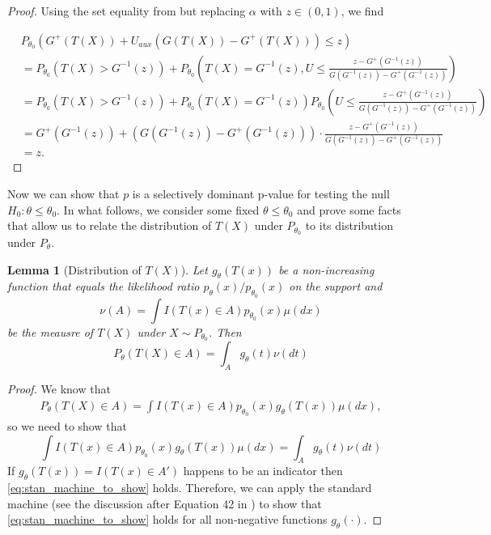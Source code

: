 \documentclass{article}
\newtheorem{lemma}{Lemma}
\begin{document}
\begin{appendix}
\begin{proof}

Using the set equality from  but replacing $\alpha$ with $z \in (0, 1)$, we find

\begin{align*}
        &P_{\theta_0}(G^+(T(X)) + U_{aux}(G(T(X)) - G^+(T(X))) \leq z)\\
        &= P_{\theta_0}(T(X) > G^{-1}(z)) + P_{\theta_0}\left(T(X) = G^{-1}(z),  U \leq \frac{z - G^+(G^{-1}(z))}{G(G^{-1}(z)) - G^{+}(G^{-1}(z))}\right)\\
        &= P_{\theta_0}(T(X) > G^{-1}(z)) + P_{\theta_0}(T(X) = G^{-1}(z)) P_{\theta_0}\left(U \leq \frac{z - G^+(G^{-1}(z))}{G(G^{-1}(z)) - G^{+}(G^{-1}(z))}\right)\\
        &=G^+(G^{-1}(z)) + (G(G^{-1}(z)) - G^{+}(G^{-1}(z))) \cdot \frac{z - G^+(G^{-1}(z))}{G(G^{-1}(z)) - G^{+}(G^{-1}(z))}\\
        &= z.
    \end{align*}

\end{proof}

Now we can show that $p$ is a selectively dominant p-value for testing the null $H_0: \theta \leq \theta_0$. In what follows, we consider some fixed $\theta \leq \theta_0$ and prove some facts that allow us to relate the distribution of $T(X)$ under $P_{\theta_0}$ to its distribution under $P_{\theta}$.

\begin{lemma}[Distribution of $T(X)$]
    \label{lem:stan_machine}
    Let $g_{\theta}(T(x))$ be a non-increasing function that equals the likelihood ratio $p_{\theta}(x)/p_{\theta_0}(x)$ on the support and 
    \begin{equation*}
        \nu(A) = \int I(T(x) \in A) p_{\theta_0}(x) \mu(dx)
    \end{equation*}
    be the meausre of $T(X)$ under $X \sim P_{\theta_0}$. Then 
    \begin{equation*}
        P_{\theta}(T(X) \in A) = \int_A g_{\theta}(t) \nu(dt)
    \end{equation*}
\end{lemma}

\begin{proof}
We know that 
\begin{align*}
    P_{\theta}(T(X) \in A) = \int I(T(x) \in A) p_{\theta_0}(x)g_{\theta}(T(x)) \mu(dx), 
\end{align*}
so we need to show that 
\begin{equation}
    \label{eq:stan_machine_to_show}
    \int I(T(x) \in A) p_{\theta_0}(x) g_{\theta}(T(x)) \mu(dx) =  \int_A g_{\theta}(t) \nu(dt)
\end{equation}
If $g_{\theta}(T(x)) = I(T(x) \in A')$ happens to be an indicator then \eqref{eq:stan_machine_to_show} holds. Therefore, we can apply the standard machine (see the discussion after Equation 42 in \cite{Lei}) to show that \eqref{eq:stan_machine_to_show} holds for all non-negative functions $g_{\theta}(\cdot)$.  
\end{proof}



\end{appendix}
\end{document}
